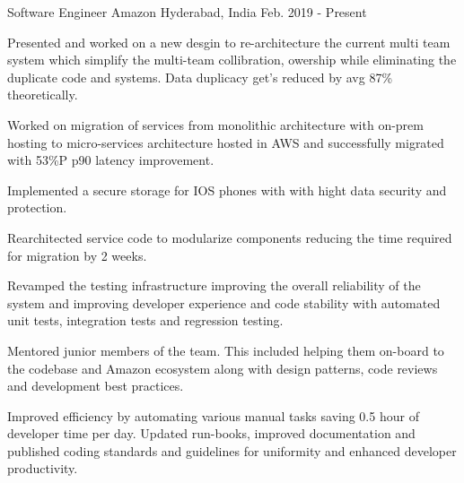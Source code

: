 

\begin{cventries}


    \cventry
    {Software Engineer} %
    {Amazon} %
    {Hyderabad, India} %
    {Feb. 2019 - Present} %
    { \begin{cvitems} %
 \item{Presented and worked on a new desgin to re-architecture the current multi team system which simplify the multi-team collibration, owership while eliminating the duplicate code and systems. Data duplicacy get's reduced by avg 87\% theoretically.} %
            \item{Worked on migration of services from monolithic architecture with on-prem hosting to micro-services architecture hosted in AWS and successfully migrated with 53\%P p90 latency improvement.} %
	   \item{Implemented a secure storage for IOS phones with with hight  data security and protection.} %
            \item {Rearchitected  service code to modularize components reducing the time required for migration by 2 weeks.}
            \item {Revamped the testing infrastructure improving the overall reliability of the system and improving developer experience and code stability with automated unit tests, integration tests and regression testing.}  %
            \item {Mentored junior members of the team. This included helping them on-board to the codebase and Amazon ecosystem along with design patterns, code reviews and development best practices.}    
            \item {Improved efficiency by automating various manual tasks saving 0.5 hour of developer time per day. Updated run-books, improved documentation and published coding standards and guidelines for uniformity and enhanced developer productivity.}  %
        \end{cvitems}
    }




\end{cventries}
